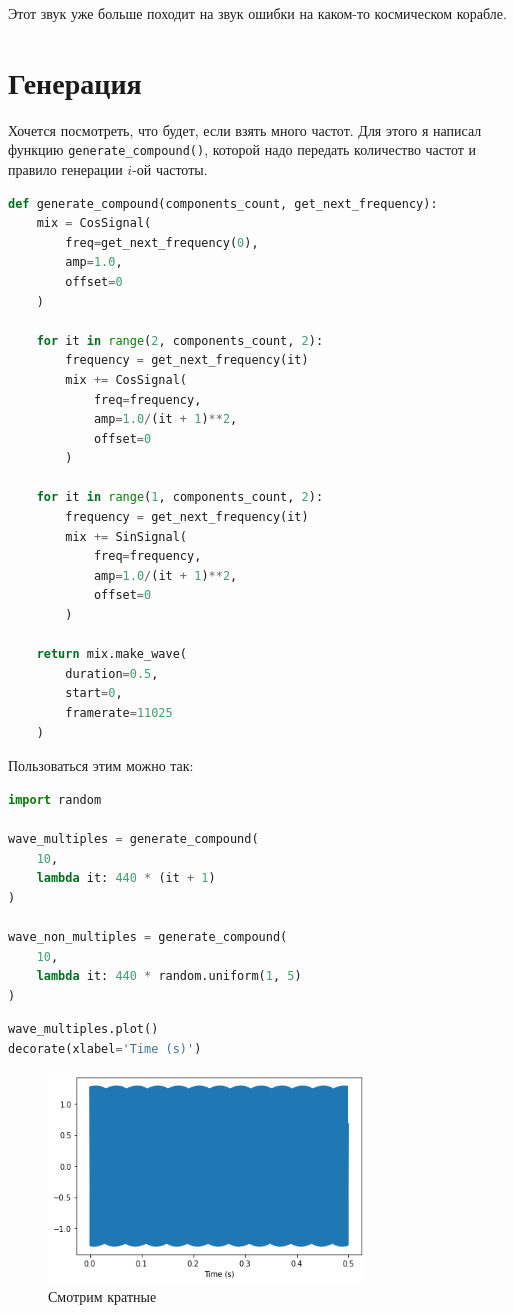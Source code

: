 \documentclass[a4paper,12pt]{report}
\begin{document}
    Этот звук уже больше походит на звук ошибки на каком-то космическом корабле.
    
    \section{Генерация}
    
    Хочется посмотреть, что будет, если взять много частот. Для этого я написал функцию \texttt{generate\_compound()}, которой надо передать количество частот и правило генерации $i$-ой частоты.
    
\begin{lstlisting}[language=Python,caption=Генерация]
def generate_compound(components_count, get_next_frequency):
    mix = CosSignal(
        freq=get_next_frequency(0),
        amp=1.0,
        offset=0
    )
    
    for it in range(2, components_count, 2):
        frequency = get_next_frequency(it)
        mix += CosSignal(
            freq=frequency,
            amp=1.0/(it + 1)**2,
            offset=0
        )
        
    for it in range(1, components_count, 2):
        frequency = get_next_frequency(it)
        mix += SinSignal(
            freq=frequency,
            amp=1.0/(it + 1)**2,
            offset=0
        )
    
    return mix.make_wave(
        duration=0.5,
        start=0,
        framerate=11025
    )
\end{lstlisting}

    Пользоваться этим можно так:
    
\begin{lstlisting}[language=Python,caption=Создаем \texttt{Wave}'ы]
import random

wave_multiples = generate_compound(
    10, 
    lambda it: 440 * (it + 1)
)

wave_non_multiples = generate_compound(
    10,
    lambda it: 440 * random.uniform(1, 5)
)
\end{lstlisting}

\begin{lstlisting}[language=Python,caption=Смотрим кратные]
wave_multiples.plot()
decorate(xlabel='Time (s)')
\end{lstlisting}

    \begin{figure}[H]
        \centering
        \includegraphics[width=0.75\textwidth]{ex3_visualizing_multiples.png}
        \caption{Смотрим кратные}
        \label{fig:ex3_visualizing_multiples}
    \end{figure}
    
\end{document}

